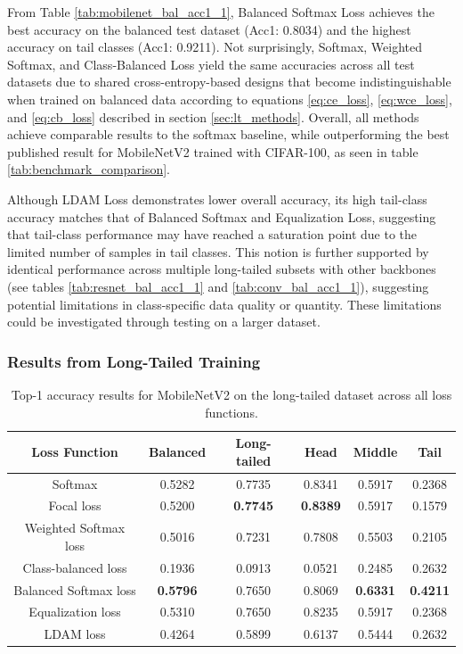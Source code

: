 From Table \ref{tab:mobilenet_bal_acc1_1}, Balanced Softmax Loss achieves the best accuracy on the balanced test dataset (Acc1: 0.8034) and the highest accuracy on tail classes (Acc1: 0.9211). Not surprisingly, Softmax, Weighted Softmax, and Class-Balanced Loss yield the same accuracies across all test datasets due to shared cross-entropy-based designs that become indistinguishable when trained on balanced data according to equations \eqref{eq:ce_loss}, \eqref{eq:wce_loss}, and \eqref{eq:cb_loss} described in section \ref{sec:lt_methods}. Overall, all methods achieve comparable results to the softmax baseline, while outperforming the best published result for MobileNetV2 trained with CIFAR-100, as seen in table \ref{tab:benchmark_comparison}.

Although LDAM Loss demonstrates lower overall accuracy, its high tail-class accuracy matches that of Balanced Softmax and Equalization Loss, suggesting that tail-class performance may have reached a saturation point due to the limited number of samples in tail classes. This notion is further supported by identical performance across multiple long-tailed subsets with other backbones (see tables \ref{tab:resnet_bal_acc1_1} and \ref{tab:conv_bal_acc1_1}), suggesting potential limitations in class-specific data quality or quantity. These limitations could be investigated through testing on a larger dataset. 

\subsubsection{Results from Long-Tailed Training}

\begin{table}[H]
    \centering
    \caption{Top-1 accuracy results for MobileNetV2 on the long-tailed dataset across all loss functions.}
    \begin{tabular}{cccccc}
        \toprule
        Loss Function & Balanced & Long-tailed & Head & Middle & Tail \\ 
        \midrule
        Softmax   & 0.5282   & 0.7735 & 0.8341 & 0.5917 & 0.2368 \\
        Focal loss   & 0.5200   & \textbf{0.7745} & \textbf{0.8389} & 0.5917 & 0.1579 \\
        Weighted Softmax loss   & 0.5016   & 0.7231 & 0.7808 & 0.5503 & 0.2105 \\
        Class-balanced loss   & 0.1936   & 0.0913 & 0.0521 & 0.2485 & 0.2632 \\
        Balanced Softmax loss   & \textbf{0.5796}   & 0.7650 & 0.8069 & \textbf{0.6331} & \textbf{0.4211} \\
        Equalization loss   & 0.5310   & 0.7650 & 0.8235 & 0.5917 & 0.2368 \\
        LDAM loss   & 0.4264 & 0.5899 & 0.6137 & 0.5444 & 0.2632 \\
        \bottomrule
    \end{tabular}
    \label{tab:mobilenet_lt_acc1_1}
\end{table}

